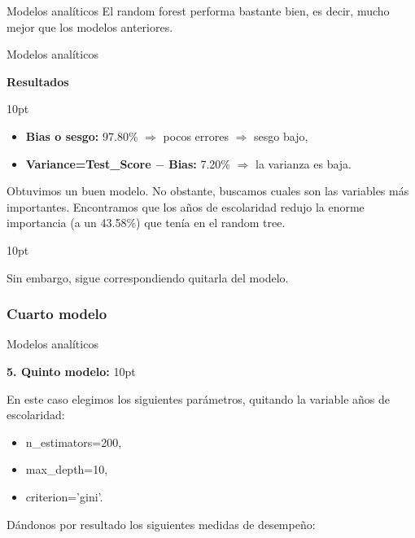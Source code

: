 \documentclass[pdf]{beamer}
\def\vspace{}%
\begin{document}
{\begin{frame}{Modelos analíticos}
    El random forest performa bastante bien, es decir, mucho mejor que los modelos anteriores.

\end{frame}

\begin{frame}{Modelos analíticos}

    \begin{Large}
        \textbf{Resultados}
    \end{Large}
    \vspace{10pt}    
    
    \begin{itemize}
        \item \textbf{Bias o sesgo:} 97.80\% $\Rightarrow$ pocos errores $\Rightarrow$ sesgo bajo,
        \item \textbf{Variance=Test\_Score $-$ Bias:} 7.20\% $\Rightarrow$ la varianza es baja.
    \end{itemize}
    
    Obtuvimos un buen modelo. No obstante, buscamos cuales son las variables más importantes. Encontramos que los años de escolaridad redujo la enorme importancia (a un 43.58\%) que tenía en el random tree. 
    
    \vspace{10pt}
    
    Sin embargo, sigue correspondiendo quitarla del modelo.

\end{frame}

\subsubsection{Cuarto modelo}

\begin{frame}{Modelos analíticos}

    \textbf{5. Quinto modelo:}
    \vspace{10pt}

    En este caso elegimos los siguientes parámetros, quitando la variable años de escolaridad:
    \begin{itemize}
        \item n\_estimators=200,
        \item max\_depth=10,
        \item criterion='gini'.
    \end{itemize}
    
    Dándonos por resultado los siguientes medidas de desempeño:
    

\end{frame}}
\end{document}
